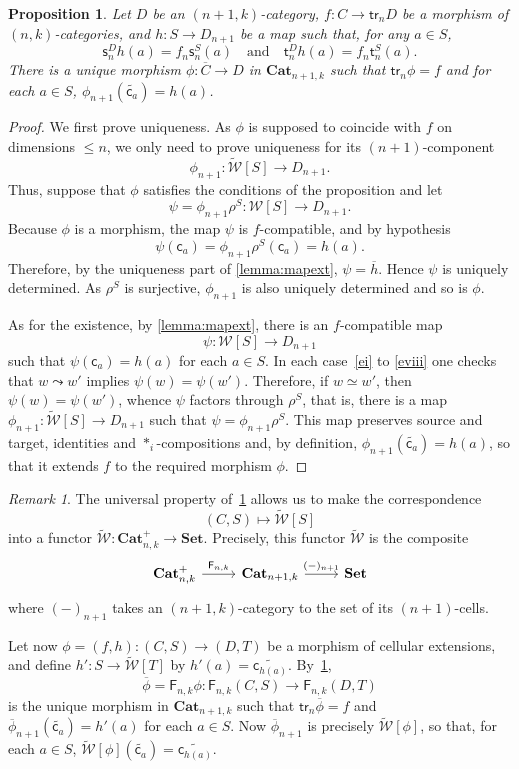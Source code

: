 \documentclass[reqno]{amsart}
\theoremstyle{plain}
\newtheorem{proposition}[subsubsection]{Proposition}
\theoremstyle{definition}
\theoremstyle{remark}
\newtheorem{remark}[subsubsection]{Remark}
\newcommand{\pair}[2]{(#1,#2)}       %
\newcommand{\source}{\mathsf{s}} %
\newcommand{\target}{\mathsf{t}} %
\newcommand{\ctg}[1]{\mathbf{#1}}  %
\newcommand{\Set}{\ctg{Set}}    %
\newcommand{\Cat}{\ctg{Cat}}   %
\newcommand{\npCat}[2]{\Cat_{#1,#2}}  %
\newcommand{\npCatp}[2]{\Cat_{#1,#2}^{+}} %
\newcommand{\functor}[1]{\mathsf{#1}} %
\newcommand{\trk}[1]{\functor{tr}_{#1}}%
\newcommand{\frf}[1]{\functor{F}_{#1}} %
\newcommand{\comp}[1]{\ast_{#1}} %
\newcommand{\sce}[1]{\source_{#1}} %
\newcommand{\tge}[1]{\target_{#1}} %
\newcommand{\clx}[2]{\pair{#1}{#2}}%
\newcommand{\WW}{\mathcal{W}}
\newcommand{\clWW}{\fcls{\WW}}
\newcommand{\wtx}[1]{\WW[#1]} %
\newcommand{\wtxeq}[1]{\clWW[#1]} %
\newcommand{\formal}[1]{\mathsf{#1}} %
\newcommand{\fcst}[1]{\formal{c}_{#1}} %
\newcommand{\frel}{\leadsto} %
\newcommand{\freq}{\simeq} %
\newcommand{\cans}[1]{\rho^{#1}} %
\newcommand{\fcls}[1]{\widetilde{#1}}%
\newcommand{\extend}[1]{\overline{#1}} %
\begin{document}
\begin{proposition}\label{prop:univprop}
   Let $D$ be an  $\pair{n{+}1}{k}$-category, $f:C\to\trk n D$ be a
   morphism of $\pair nk$-categories,
   and  $h:S\to D_{n+1}$ be a map such that, for any $a\in S$,
   \[
     \sce n^Dh(a)=f_n\sce n^S (a)
     \quad\text{and}\quad \tge n^D h(a)=f_n\tge n^S (a).
     \]
   There is a unique
    morphism $\phi:\extend C\to D$ in $\npCat{n+1}{k}$ such that $\trk
    n\phi=f$ and for each $a\in S$, $\phi_{n+1}(\fcls{\fcst a})=h(a)$.
  \end{proposition}
  \begin{proof}
We first prove uniqueness. As $\phi$ is supposed to coincide with $f$ on
dimensions $\leq n$, we only need to prove uniqueness for its
$(n{+}1)$-component
\[\phi_{n+1}:\wtxeq S\to D_{n+1}.\]
 Thus, suppose
that $\phi$ satisfies the conditions of the proposition and let
\[\psi=\phi_{n+1} \cans{S}:\wtx S\to D_{n+1}.\]
   Because $\phi$ is a morphism, the  map $\psi$ is
   $f$-compatible, and by hypothesis \[\psi(\fcst
   a)=\phi_{n+1}\cans S(\fcst a)=h(a).\] Therefore, by the uniqueness
   part of
   \cref{lemma:mapext}, $\psi=\extend h$. Hence $\psi$ is uniquely determined.
As $\cans S$  is surjective,
  $\phi_{n+1}$ is also uniquely determined and so is $\phi$.

  As for the existence, by \cref{lemma:mapext}, there is an
  $f$-compatible map
  \[\psi:\wtx S\to D_{n+1}\]
  such that $\psi(\fcst a)=h(a)$ for each $a\in S$. 
  In each case~\ref{ei} to \ref{eviii} one checks that $w\frel w'$
  implies $\psi(w)=\psi(w')$. Therefore, if $w\freq w'$, then
  $\psi(w)=\psi(w')$, whence $\psi$ factors through $\cans S$, that
  is, there is a map $\phi_{n+1}:\wtxeq S\to D_{n+1}$ such that
  $\psi=\phi_{n+1}\cans S$. This map preserves source and target,
  identities and $\comp i$-compositions and, by definition, $\phi_{n+1}(\fcls
  {\fcst{a}})=h(a)$, so that it extends $f$ to the required morphism $\phi$. 
\end{proof}
\begin{remark}\label{rmk:functoriality_of_wtxeq}
  The universal property of~\cref{prop:univprop} allows us to make the correspondence
  \[\clx CS\mapsto \wtxeq S\]
  into a functor $\clWW:\npCatp
  nk\to\Set$. Precisely, this functor $\clWW$ is the composite
  \[
    \begin{tikzcd}
      \npCatp nk\ar[r,"\frf{n,k}"]& \npCat{n+1}k \ar[r,"(-)_{n+1}"]& \Set
    \end{tikzcd}
    \]
  where $(-)_{n+1}$ takes an $\pair{n{+}1}k$-category to the set of
  its $(n{+}1)$-cells.

  Let now $\phi=\pair fh:\clx CS\to \clx DT$
  be a morphism of cellular extensions, and define $h':S\to\wtxeq T$
  by $h'(a)=\fcls{\fcst{h(a)}}$. By~\cref{prop:univprop},
  \[\extend\phi=\frf{n,k}\phi:\frf{n,k}\clx CS\to\frf{n,k}\clx DT\] is
  the unique morphism in $\npCat{n+1}k$ such that $\trk
  n\extend\phi=f$ and $\extend{\phi}_{n+1}(\fcls{\fcst a})=h'(a)$ for
  each $a\in S$. Now
  $\extend{\phi}_{n+1}$ is precisely $\wtxeq{\phi}$, so that, for each $a\in
  S$, $\wtxeq{\phi}(\fcls{\fcst a})=\fcls{\fcst{h(a)}}$.
\end{remark}
\end{document}
